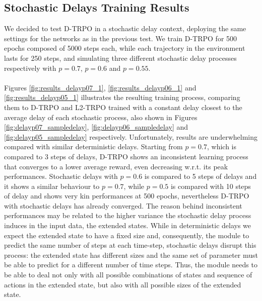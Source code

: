         \subsection{Stochastic Delays Training Results}
        \label{sub:res_stoch_delays}
            We decided to test D-TRPO in a stochastic delay context, deploying the same settings for the networks as in the previous test. We train D-TRPO for 500 epochs composed of 5000 steps each, while each trajectory in the environment lasts for 250 steps, and simulating three different stochastic delay processes respectively with $p=0.7$, $p=0.6$ and $p=0.55$.
            \\\\
            Figures \ref{fig:results_delayp07_1}, \ref{fig:results_delayp06_1} and \ref{fig:results_delayp05_1} illustrates the resulting training process, comparing them to D-TRPO and L2-TRPO trained with a constant delay closest to the average delay of each stochastic process, also shown in Figures \ref{fig:delayp07_sampledelay}, \ref{fig:delayp06_sampledelay} and \ref{fig:delayp05_sampledelay} respectively. Unfortunately, results are underwhelming compared with similar deterministic delays. Starting from $p=0.7$, which is compared to 3 steps of delays, D-TRPO shows an inconsistent learning process that converges to a lower average reward, even decreasing w.r.t. its peak performances. Stochastic delays with $p=0.6$ is compared to 5 steps of delays and it shows a similar behaviour to $p=0.7$, while $p=0.5$ is compared with 10 steps of delay and shows very kin performances at 500 epochs, nevertheless D-TRPO with stochastic delays has already converged.
            The reason behind inconsistent performances may be related to the higher variance the stochastic delay process induces in the input data, the extended states. While in deterministic delays we expect the extended state to have a fixed size and, consequently, the module to predict the same number of steps at each time-step, stochastic delays disrupt this process: the extended state has different sizes and the same set of parameter must be able to predict for a different number of time steps. Thus, the module needs to be able to deal not only with all possible combinations of states and sequence of actions in the extended state, but also with all possible sizes of the extended state. 
            
